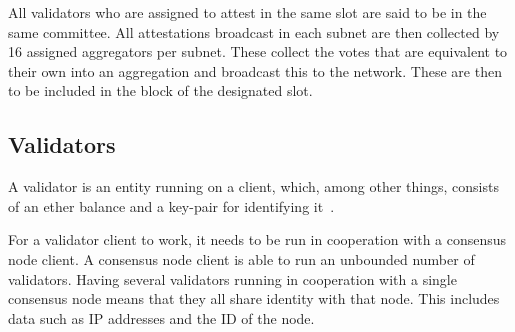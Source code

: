All validators who are assigned to attest in the same slot are said to be in the same committee.
All attestations broadcast in each subnet are then collected by 16 assigned aggregators per subnet.
These collect the votes that are equivalent to their own into an aggregation and broadcast this to the network.
These are then to be included in the block of the designated slot.


%
%

\subsection{Validators}\label{subsec:validator}
A validator is an entity running on a client,
which, among other things, consists of an ether balance and a key-pair for identifying it~\cite{Staking}.

For a validator client to work, it needs to be run in cooperation with a consensus node client.
A consensus node client is able to run an unbounded number of validators.
Having several validators running in cooperation with a single consensus node means that they all share identity with that node.
This includes data such as IP addresses and the ID of the node.

